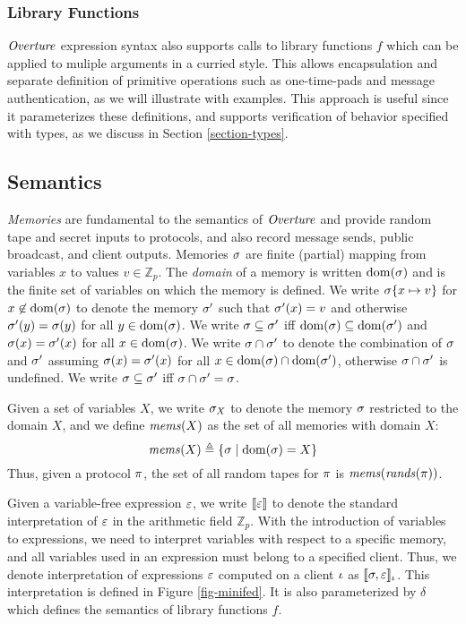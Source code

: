 \subsubsection{Library Functions} $\mathit{Overture}$ expression syntax also supports
calls to library functions $f$ which can be applied to muliple arguments in a
curried style. This allows encapsulation and separate
definition of primitive operations such as one-time-pads and message
authentication, as we will illustrate with examples. This approach is
useful since it parameterizes these definitions, and 
supports verification of behavior specified with types, as we
discuss in Section \ref{section-types}.

\subsection{Semantics}

\emph{Memories} are fundamental to the semantics of $\mathit{Overture}$ and
provide random tape and secret inputs to protocols, and also record
message sends, public broadcast, and client outputs. Memories $\sigma$ are finite
(partial) mapping from variables $x$ to values $v \in \mathbb{Z}_p$. The \emph{domain} of a
memory is written $\mathrm{dom}(\sigma)$ and is the finite set of variables on
which the memory is defined. We write $\sigma\{ x \mapsto v\}$ for
$x\not\in\mathrm{dom}(\sigma)$ to denote the memory $\sigma'$ such that
$\sigma'(x) = v$ and otherwise $\sigma'(y) = \sigma(y)$ for all $y
\in \mathrm{dom}(\sigma)$. We write $\sigma \subseteq \sigma'$ iff
$\mathrm{dom}(\sigma) \subseteq \mathrm{dom}(\sigma')$ and $\sigma(x) =
\sigma'(x)$ for all $x \in \mathrm{dom}(\sigma)$. We write $\sigma \cap
\sigma'$ to denote the combination of $\sigma$ and $\sigma'$
assuming $\sigma(x) = \sigma'(x)$ for all $x \in \mathrm{dom}(\sigma)
\cap \mathrm{dom}(\sigma')$, otherwise $\sigma \cap \sigma'$ is undefined.
We write $\sigma \subseteq \sigma'$ iff $\sigma \cap \sigma'
= \sigma$.

Given a set of variables $X$, we write $\sigma_X$ to denote the
memory $\sigma$ restricted to the domain $X$, and we define
$\mathit{mems}(X)$ as the set of all memories with domain $X$:
$$
\mathit{mems}(X) \triangleq \{ \sigma \mid \mathrm{dom}(\sigma) = X \}
$$
Thus, given a protocol $\pi$, the set of all random tapes for
$\pi$ is $\mathit{mems}(\mathit{rands}(\pi))$.

Given a variable-free expression $\varepsilon$, we write $\llbracket \varepsilon \rrbracket$ to denote
the standard interpretation of $\varepsilon$ in the arithmetic field
$\mathbb{Z}_{p}$. With the introduction of variables to expressions,
we need to interpret variables with respect to a specific memory, and
all variables used in an expression must belong to a specified client.
Thus, we denote interpretation of expressions $\varepsilon$ computed on a
client $\iota$ as $\llbracket \sigma,\varepsilon \rrbracket_{\iota}$. This interpretation is
defined in Figure \ref{fig-minifed}. It is also parameterized by
$\delta$ which defines the semantics of library functions $f$.


